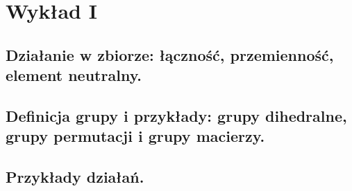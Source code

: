 \chapter{Wykład I}
\section{Działanie w zbiorze: łączność, przemienność, element neutralny. }
\section{Definicja grupy i przykłady: grupy dihedralne, grupy permutacji i grupy macierzy.}
\section{Przykłady działań.}
